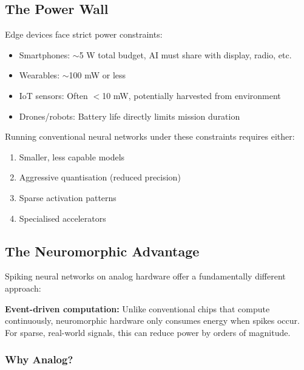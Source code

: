 \documentclass[11pt,a4paper]{article}
\begin{document}
\subsection{The Power Wall}

Edge devices face strict power constraints:
\begin{itemize}
    \item Smartphones: $\sim$5 W total budget, AI must share with display, radio, etc.
    \item Wearables: $\sim$100 mW or less
    \item IoT sensors: Often $<$10 mW, potentially harvested from environment
    \item Drones/robots: Battery life directly limits mission duration
\end{itemize}

Running conventional neural networks under these constraints requires either:
\begin{enumerate}
    \item Smaller, less capable models
    \item Aggressive quantisation (reduced precision)
    \item Sparse activation patterns
    \item Specialised accelerators
\end{enumerate}

\subsection{The Neuromorphic Advantage}

Spiking neural networks on analog hardware offer a fundamentally different approach:

\begin{tcolorbox}[keypoint]
\textbf{Event-driven computation:} Unlike conventional chips that compute continuously, neuromorphic hardware only consumes energy when spikes occur. For sparse, real-world signals, this can reduce power by orders of magnitude.
\end{tcolorbox}

\subsubsection{Why Analog?}
\end{document}
